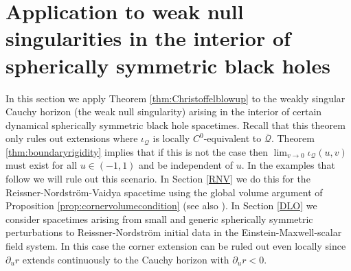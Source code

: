 \documentclass{article}
\newcommand{\Q}{\mathcal{Q}}
\begin{document}
\section{Application to  weak null singularities in the interior of spherically symmetric black holes}\label{Application to  weak null singularities in the interior of spherically symmetric black holes}
In this section we apply Theorem \ref{thm:Christoffelblowup} to the weakly singular Cauchy horizon (the weak null singularity) arising in the interior of certain dynamical spherically symmetric black hole spacetimes. Recall that this theorem only rules out extensions where $\iota_\Q$ is locally $C^0$-equivalent to $\overline{\Q}$. Theorem \ref{thm:boundaryrigidity} implies that if this is not the case then $\lim_{v\to0}\iota_{\Q}(u,v)$ must exist for all $u\in(-1,1)$ and be independent of $u$. In the examples that follow we will rule out this scenario. In Section \ref{RNV} we do this for the Reissner-Nordstr\"{o}m-Vaidya spacetime using the global volume argument of Proposition \ref{prop:cornervolumecondition} (see also \cite[Section 4]{CameronSbierski}). In Section \ref{DLO} we consider spacetimes arising from small and generic spherically symmetric perturbations to Reissner-Nordstr\"{o}m initial data in the Einstein-Maxwell-scalar field system. In this case the corner extension can be ruled out even locally since $\partial_ur$ extends continuously to the Cauchy horizon with $\partial_ur<0$.
\end{document}
